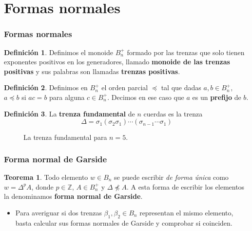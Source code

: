 \documentclass{beamer}
\theoremstyle{definition}
\newtheorem{teorema}{Teorema}
\newtheorem{defi}{Definición}
\newcommand{\Z}{\mathbb{Z}}
\begin{document}
\section{Formas normales}
\begin{frame}
\frametitle{Formas normales}
\begin{defi}
Definimos el monoide $B_n^+$ formado por las trenzas que solo tienen exponentes positivos en los generadores, llamado \textbf{monoide de las trenzas positivas} y sus palabras son llamadas \textbf{trenzas positivas}.
\end{defi}
\begin{defi}
Definimos en $B_n^+$ el orden parcial $\preccurlyeq$ tal que dadas $a,b\in B_n^+$, $a\preccurlyeq b$ si $ac=b$ para alguna $c\in B_n^+$. Decimos en ese caso que $a$ es un \textbf{prefijo} de $b$. %
\end{defi}
\end{frame}

\begin{frame}

\begin{defi}
La \textbf{trenza fundamental} de $n$ cuerdas es la trenza
$$\Delta=\sigma_1(\sigma_2\sigma_1)\cdots(\sigma_{n-1}\cdots\sigma_1)$$
\end{defi} 
\begin{figure}[h!]
\centering
{}
\caption{La trenza fundamental para $n=5$.}
\end{figure}
\end{frame}

\begin{frame}
\frametitle{Forma normal de Garside}

\begin{teorema}
Todo elemento $w\in B_n$ se puede escribir \emph{de forma única} como $w=\Delta^pA$, donde $p\in\Z$, $A\in B_n^+$ y $\Delta\not\preccurlyeq A$. A esta forma de escribir los elementos la denominamos \textbf{forma normal de Garside}.
\end{teorema}

\begin{itemize}
\item Para averiguar si dos trenzas $\beta_1,\beta_2\in B_n$ representan el mismo elemento, basta calcular sus formas normales de Garside y comprobar si coinciden. 
\end{itemize}
\end{frame}
\end{document}
